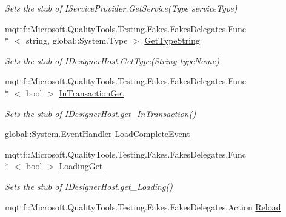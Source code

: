 \begin{DoxyCompactItemize}
\begin{DoxyCompactList}\small\item\em Sets the stub of I\-Service\-Provider.\-Get\-Service(\-Type service\-Type)\end{DoxyCompactList}\item 
mqttf\-::\-Microsoft.\-Quality\-Tools.\-Testing.\-Fakes.\-Fakes\-Delegates.\-Func\\*
$<$ string, global\-::\-System.\-Type $>$ \hyperlink{class_system_1_1_component_model_1_1_design_1_1_serialization_1_1_fakes_1_1_stub_i_designer_loader_host_a514b4e20e7dae33db6db3bbefb9cd55a}{Get\-Type\-String}
\begin{DoxyCompactList}\small\item\em Sets the stub of I\-Designer\-Host.\-Get\-Type(\-String type\-Name)\end{DoxyCompactList}\item 
mqttf\-::\-Microsoft.\-Quality\-Tools.\-Testing.\-Fakes.\-Fakes\-Delegates.\-Func\\*
$<$ bool $>$ \hyperlink{class_system_1_1_component_model_1_1_design_1_1_serialization_1_1_fakes_1_1_stub_i_designer_loader_host_a646ee3226f2f066eeb24098982513d90}{In\-Transaction\-Get}
\begin{DoxyCompactList}\small\item\em Sets the stub of I\-Designer\-Host.\-get\-\_\-\-In\-Transaction()\end{DoxyCompactList}\item 
global\-::\-System.\-Event\-Handler \hyperlink{class_system_1_1_component_model_1_1_design_1_1_serialization_1_1_fakes_1_1_stub_i_designer_loader_host_a63574fdf9390515fc0888d9a0f990e30}{Load\-Complete\-Event}
\item 
mqttf\-::\-Microsoft.\-Quality\-Tools.\-Testing.\-Fakes.\-Fakes\-Delegates.\-Func\\*
$<$ bool $>$ \hyperlink{class_system_1_1_component_model_1_1_design_1_1_serialization_1_1_fakes_1_1_stub_i_designer_loader_host_a76c1886c0df5f91b58686947100e9763}{Loading\-Get}
\begin{DoxyCompactList}\small\item\em Sets the stub of I\-Designer\-Host.\-get\-\_\-\-Loading()\end{DoxyCompactList}\item 
mqttf\-::\-Microsoft.\-Quality\-Tools.\-Testing.\-Fakes.\-Fakes\-Delegates.\-Action \hyperlink{class_system_1_1_component_model_1_1_design_1_1_serialization_1_1_fakes_1_1_stub_i_designer_loader_host_a4f52d45b82152c311c8ea44e6c84f56e}{Reload}

\end{DoxyCompactItemize}
